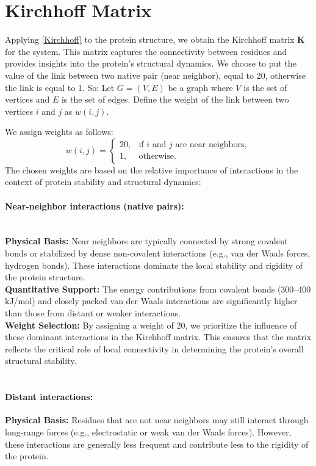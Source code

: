 \documentclass[English, Lau, oneside]{sapthesis}
\begin{document}
\newpage
\section*{Kirchhoff Matrix}
\noindent Applying \eqref{Kirchhoff} to the protein structure, we obtain the Kirchhoff matrix \(\mathbf{K}\) for the system. This matrix captures the connectivity between residues and provides insights into the protein's structural dynamics. 
We choose to put the value of the link between two native pair (near neighbor), equal to 20, otherwise the link is equal to 1.
So:
Let \( G = (V, E) \) be a graph where \( V \) is the set of vertices and \( E \) is the set of edges. Define the weight of the link between two vertices \( i \) and \( j \) as \( w(i, j) \).

We assign weights as follows:
\[
w(i, j) =
\begin{cases}
20, & \text{if } i \text{ and } j \text{ are near neighbors}, \\
1, & \text{otherwise}.
\end{cases}
\]
The chosen weights are based on the relative importance of interactions in the context of protein stability and structural dynamics:
\paragraph{Near-neighbor interactions (native pairs):} \\
\textbf{Physical Basis:} Near neighbors are typically connected by strong covalent bonds or stabilized by dense non-covalent interactions (e.g., van der Waals forces, hydrogen bonds). These interactions dominate the local stability and rigidity of the protein structure.\\

\textbf{Quantitative Support:} The energy contributions from covalent bonds (300–400 kJ/mol) and closely packed van der Waals interactions are significantly higher than those from distant or weaker interactions.\\

\textbf{Weight Selection:} By assigning a weight of 20, we prioritize the influence of these dominant interactions in the Kirchhoff matrix. This ensures that the matrix reflects the critical role of local connectivity in determining the protein's overall structural stability.\\
\\
\paragraph{Distant interactions:}
\textbf{Physical Basis:} Residues that are not near neighbors may still interact through long-range forces (e.g., electrostatic or weak van der Waals forces). However, these interactions are generally less frequent and contribute less to the rigidity of the protein.
\end{document}
